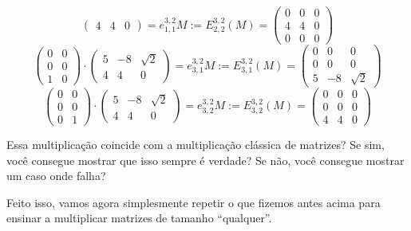 \begin{ex}
\[\begin{pmatrix}
	4 & 4 & 0
	\end{pmatrix}=e^{3,2}_{1,1}M:=E^{3,2}_{2,2}(M)=\begin{pmatrix}
	0&0&0\\
	4 & 4 & 0\\	
	0&0&0
	\end{pmatrix}\]
	\[\begin{pmatrix}
	0&0\\
	0&0\\
	1&0
	\end{pmatrix}\cdot \begin{pmatrix}
	5 & -8 & \sqrt 2\\
	4 & 4 & 0
	\end{pmatrix}=e^{3,2}_{3,1}M:=E^{3,2}_{3,1}(M)=\begin{pmatrix}
	0&0&0\\
	0&0&0\\	
	5 & -8 & \sqrt2
	\end{pmatrix}\]
	\[\begin{pmatrix}
	0&0\\
	0&0\\
	0&1
	\end{pmatrix}\cdot \begin{pmatrix}
	5 & -8 & \sqrt 2\\
	4 & 4 & 0
	\end{pmatrix}=e^{3,2}_{3,2}M:=E^{3,2}_{3,2}(M)=\begin{pmatrix}
	0&0&0\\
	0&0&0\\	
	4 & 4 & 0
	\end{pmatrix}\]
\end{ex}

\begin{exerc}
	Essa multiplicação coincide com a multiplicação clássica de matrizes? Se sim, você consegue mostrar que isso sempre é verdade? Se não, você consegue mostrar um caso onde falha?
\end{exerc}

Feito isso, vamos agora simplesmente repetir o que fizemos antes acima para ensinar a multiplicar matrizes de tamanho ``qualquer''.

